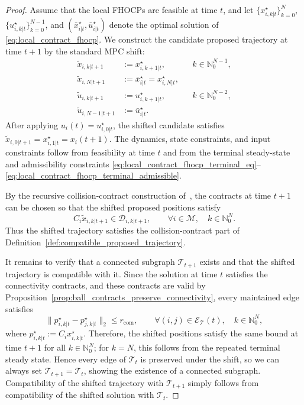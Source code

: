 \documentclass[letterpaper, 10 pt, conference]{ieeeconf}  %
\begin{document}
\begin{proof}
	Assume that the local FHOCPs are feasible at time $t$, and let
	$\{x^\star_{i,k|t}\}_{k=0}^{N}$,
	$\{u^\star_{i,k|t}\}_{k=0}^{N-1}$, and
	$(\bar x^\star_{i|t},\bar u^\star_{i|t})$ denote the optimal solution of
	\eqref{eq:local_contract_fhocp}. We construct the candidate proposed trajectory
	at time $t+1$ by the standard MPC shift:
	\begin{align}
		\tilde x_{i,k|t+1}
		 & :=
		x^\star_{i,k+1|t},
		 &    & k\in\mathbb{N}_0^{N-1},
		\label{eq:shifted_state_1}
		\\
		\tilde x_{i,N|t+1}
		 & :=
		\bar x^\star_{i|t}
		=
		x^\star_{i,N|t},
		\label{eq:shifted_state_2}
		\\
		\tilde u_{i,k|t+1}
		 & :=
		u^\star_{i,k+1|t},
		 &    & k\in\mathbb{N}_0^{N-2},
		\label{eq:shifted_input_1}
		\\
		\tilde u_{i,N-1|t+1}
		 & :=
		\bar u^\star_{i|t}.
		\label{eq:shifted_input_2}
	\end{align}
	After applying $u_i(t)=u^\star_{i,0|t}$, the shifted candidate satisfies
	$\tilde x_{i,0|t+1}=x^\star_{i,1|t}=x_i(t+1)$. The dynamics, state constraints,
	and input constraints follow from feasibility at time $t$ and from the terminal
	steady-state and admissibility constraints
	\eqref{eq:local_contract_fhocp_terminal_eq}--\eqref{eq:local_contract_fhocp_terminal_admissible}.

	By the recursive collision-contract construction of~\cite{bodmer2026anytime},
	the contracts at time $t+1$ can be chosen so that the shifted proposed
	positions satisfy
	\[
		C_i\tilde x_{i,k|t+1}\in\mathcal{D}_{i,k|t+1},
		\qquad
		\forall i\in\mathcal{M},\quad k\in\mathbb{N}_0^N.
	\]
	Thus the shifted trajectory satisfies the collision-contract part of
	Definition~\ref{def:compatible_proposed_trajectory}.

	It remains to verify that a connected subgraph $\mathcal{T}_{t+1}$ exists and that the shifted trajectory is compatible with it.
	Since the solution at time $t$ satisfies the connectivity contracts, and these contracts
	are valid by Proposition~\ref{prop:ball_contracts_preserve_connectivity}, every
	maintained edge satisfies
	\[
		\|p^\star_{i,k|t}-p^\star_{j,k|t}\|_2
		\leq r_{\mathrm{com}},
		\qquad
		\forall (i,j)\in\mathcal{E}_{\mathcal{T}}(t),\quad
		k\in\mathbb{N}_0^N,
	\]
	where $p^\star_{i,k|t}:=C_i x^\star_{i,k|t}$. Therefore, the shifted positions
	satisfy the same bound at time $t+1$ for all
	$k\in\mathbb{N}_0^N$; for $k=N$, this follows from the repeated terminal
	steady state. Hence every edge of $\mathcal{T}_t$ is preserved under the shift, so we can always set $\mathcal{T}_{t+1}=\mathcal{T}_t$, showing the existence of a connected subgraph. Compatibility of the shifted trajectory with $\mathcal{T}_{t+1}$ simply follows from compatibility of the shifted solution with $\mathcal{T}_t$.


\end{proof}
\end{document}
